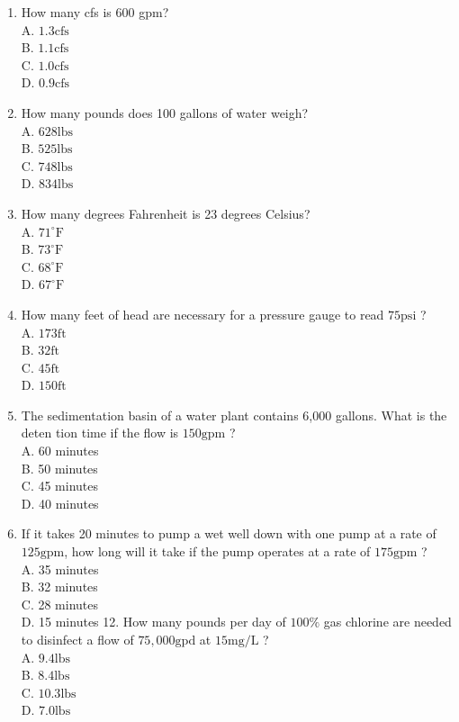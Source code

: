 \begin{enumerate}
  \item How many cfs is 600 gpm?\\
A. $1.3 \mathrm{cfs}$\\
B. $1.1 \mathrm{cfs}$\\
C. $1.0 \mathrm{cfs}$\\
D. $0.9 \mathrm{cfs}$

  \item How many pounds does 100 gallons of water weigh?\\
A. $628 \mathrm{lbs}$\\
B. $525 \mathrm{lbs}$\\
C. $748 \mathrm{lbs}$\\
D. $834 \mathrm{lbs}$

  \item How many degrees Fahrenheit is 23 degrees Celsius?\\
A. $71^{\circ} \mathrm{F}$\\
B. $73^{\circ} \mathrm{F}$\\
C. $68^{\circ} \mathrm{F}$\\
D. $67^{\circ} \mathrm{F}$

  \item How many feet of head are necessary for a pressure gauge to read $75 \mathrm{psi}$ ?\\
A. $173 \mathrm{ft}$\\
B. $32 \mathrm{ft}$\\
C. $45 \mathrm{ft}$\\
D. $150 \mathrm{ft}$

  \item The sedimentation basin of a water plant contains 6,000 gallons. What is the deten tion time if the flow is $150 \mathrm{gpm}$ ?\\
A. 60 minutes\\
B. 50 minutes\\
C. 45 minutes\\
D. 40 minutes

  \item If it takes 20 minutes to pump a wet well down with one pump at a rate of $125 \mathrm{gpm}$, how long will it take if the pump operates at a rate of $175 \mathrm{gpm}$ ?\\
A. 35 minutes\\
B. 32 minutes\\
C. 28 minutes\\
D. 15 minutes 12. How many pounds per day of $100 \%$ gas chlorine are needed to disinfect a flow of $75,000 \mathrm{gpd}$ at $15 \mathrm{mg} / \mathrm{L}$ ?\\
A. $9.4 \mathrm{lbs}$\\
B. $8.4 \mathrm{lbs}$\\
C. $10.3 \mathrm{lbs}$\\
D. $7.0 \mathrm{lbs}$


\end{enumerate}
